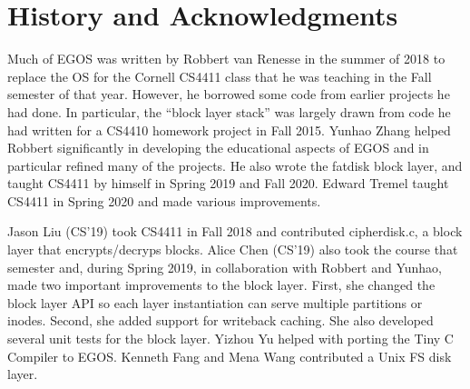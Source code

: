 \documentclass{article}
\begin{document}
\section{History and Acknowledgments}

Much of EGOS was written by Robbert van Renesse in the summer of 2018
to replace the OS for the Cornell CS4411 class that he was teaching in the
Fall semester of that year.  However, he borrowed some code from earlier
projects he had done.  In particular, the ``block layer stack'' was largely
drawn from code he had written for a CS4410 homework project in Fall 2015.
Yunhao Zhang helped Robbert significantly in developing the educational
aspects of EGOS and in particular refined many of the projects.  He also
wrote the fatdisk block layer, and taught CS4411 by himself in
Spring 2019 and Fall 2020.
Edward Tremel taught CS4411 in Spring 2020 and made various improvements.

Jason Liu (CS'19) took CS4411 in Fall 2018 and contributed cipherdisk.c, a
block layer that encrypts/decryps blocks.  Alice Chen (CS'19) also took the
course that semester and, during Spring 2019, in collaboration with Robbert
and Yunhao, made two important improvements to the block layer.  First, she
changed the block layer API so each layer instantiation can serve multiple
partitions or inodes.  Second, she added support for writeback caching.
She also developed several unit tests for the block layer.
Yizhou Yu helped with porting the Tiny C Compiler to EGOS.
Kenneth Fang and Mena Wang contributed a Unix FS disk layer.
\end{document}
